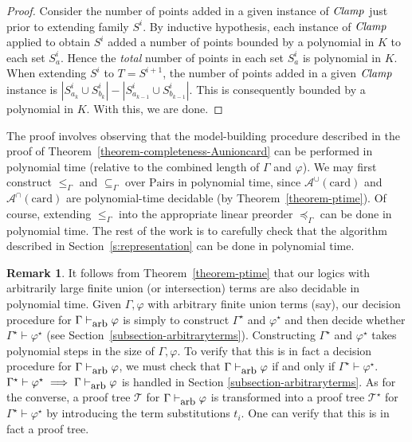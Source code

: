 \documentclass[letterpaper]{article}
\theoremstyle{definition}
\newtheorem{remark}[theorem]{Remark}
\newcommand{\proves}{\vdash}
\newcommand{\Aunion}{\mathscr{A}^{\cup}}
\newcommand{\Ainter}{\mathscr{A}^{\cap}}
\newcommand{\card}{\mathrm{card}}
\newcommand{\provesarbitrary}{\proves_{\mbox{\small{arb}}}}
\newcommand{\Pairs}{\mbox{Pairs}}
\newcommand{\Clamp}{\protect{\mbox{\textit{Clamp}}}}
\newcommand{\provsub}{\subseteq_{\Gamma}}
\newcommand{\provle}{\le_{\Gamma}}
\newcommand{\provextended}{\preceq_{\Gamma}}
\begin{document}
\begin{proof}
Consider the number of points added in a given instance of $\Clamp$ just prior to extending family $S^i$.  By inductive hypothesis, each instance of $\Clamp$ applied to obtain $S^i$ added a number of points bounded by a polynomial in $K$ to each set $S^i_a$.  Hence the \textit{total} number of points in each set $S^i_a$ is polynomial in $K$.  When extending $S^i$ to $T = S^{i+1}$, the number of points added in a given $\Clamp$ instance is $|S^i_{a_k} \cup S^i_{b_k}| - |S^i_{a_{k-1}} \cup S^i_{b_{k-1}}|$.  This is consequently bounded by a polynomial in $K$.
With this, we are done.
\end{proof}

The proof involves observing that the model-building procedure described in the proof of Theorem~\ref{theorem-completeness-Aunioncard} can be performed in polynomial time (relative to the combined length of $\Gamma$ and $\varphi$).  We may first construct $\provle$ and $\provsub$ over $\Pairs$ in polynomial time, since $\Aunion(\card)$ and $\Ainter(\card)$ are polynomial-time decidable (by Theorem~\ref{theorem-ptime}).  Of course, extending $\provle$ into the appropriate linear preorder $\provextended$ can be done in polynomial time.  The rest of the work is to carefully check that the algorithm described in Section~\ref{s:representation} can be done in polynomial time.  %

\begin{remark}
It follows from Theorem~\ref{theorem-ptime} that our logics with arbitrarily large finite union (or intersection) terms are also decidable in polynomial time.  
Given $\Gamma, \varphi$ with arbitrary finite union terms (say), our decision procedure for $\Gamma \provesarbitrary \varphi$ is simply to construct $\Gamma^\star$ and $\varphi^\star$ and then decide whether $\Gamma^\star \proves \varphi^\star$ (see Section~\ref{subsection-arbitraryterms}).  
Constructing $\Gamma^\star$ and $\varphi^\star$ takes polynomial steps in the size of $\Gamma, \varphi$.  To verify that this is in fact a decision procedure for $\Gamma \provesarbitrary \varphi$, we must check that $\Gamma \provesarbitrary \varphi$ if and only if $\Gamma^\star \proves \varphi^\star$.  $\Gamma^\star \proves \varphi^\star \implies \Gamma \provesarbitrary \varphi$ is handled in Section \ref{subsection-arbitraryterms}.  As for the converse, a proof tree $\mathcal{T}$ for $\Gamma \provesarbitrary \varphi$ is transformed into a proof tree $\mathcal{T}^\star$ for $\Gamma^\star \proves \varphi^\star$ by introducing the term substitutions $t_i$.  One can verify that this is in fact a proof tree.  %
\label{remark-complexity}
\end{remark}
\end{document}
